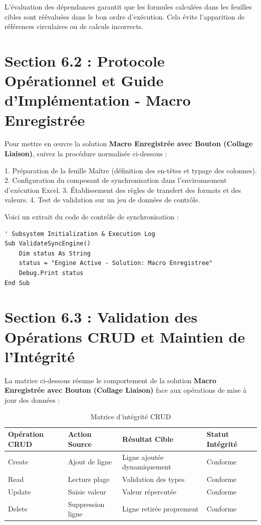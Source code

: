 \documentclass[12pt,a4paper]{report}
\begin{document}
L'évaluation des dépendances garantit que les formules calculées dans les feuilles cibles sont réévaluées dans le bon ordre d'exécution. Cela évite l'apparition de références circulaires ou de calculs incorrects.


\section{Section 6.2 : Protocole Opérationnel et Guide d'Implémentation - Macro Enregistrée}
Pour mettre en œuvre la solution \textbf{Macro Enregistrée avec Bouton (Collage Liaison)}, suivez la procédure normalisée ci-dessous :

1. Préparation de la feuille Maître (définition des en-têtes et typage des colonnes).
2. Configuration du composant de synchronisation dans l'environnement d'exécution Excel.
3. Établissement des règles de transfert des formats et des valeurs.
4. Test de validation sur un jeu de données de contrôle.

Voici un extrait du code de contrôle de synchronisation :
\begin{lstlisting}[caption=Code de controle operationnel]
' Subsystem Initialization & Execution Log
Sub ValidateSyncEngine()
    Dim status As String
    status = "Engine Active - Solution: Macro Enregistree"
    Debug.Print status
End Sub
\end{lstlisting}


\section{Section 6.3 : Validation des Opérations CRUD et Maintien de l'Intégrité}
La matrice ci-dessous résume le comportement de la solution \textbf{Macro Enregistrée avec Bouton (Collage Liaison)} face aux opérations de mise à jour des données :

\begin{table}[h]
\centering
\begin{tabular}{@{}llll@{}}
\toprule
\textbf{Opération CRUD} & \textbf{Action Source} & \textbf{Résultat Cible} & \textbf{Statut Intégrité} \\ \midrule
Create & Ajout de ligne & Ligne ajoutée dynamiquement & Conforme \\
Read & Lecture plage & Validation des types & Conforme \\
Update & Saisie valeur & Valeur répercutée & Conforme \\
Delete & Suppression ligne & Ligne retirée proprement & Conforme \\ \bottomrule
\end{tabular}
\caption{Matrice d'intégrité CRUD}
\end{table}
\end{document}
